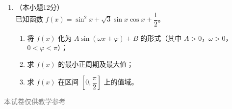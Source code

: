 \documentclass[12pt, a4paper]{ctexart}
\begin{document}
\begin{enumerate}[resume]
\vspace{7cm}

\item[22.]（本小题12分）\\
已知函数 $f(x)=\sin^2 x+\sqrt{3}\sin x\cos x+\dfrac{1}{2}$。
\begin{enumerate}[(1)]
  \item 将 $f(x)$ 化为 $A\sin(\omega x+\varphi)+B$ 的形式（其中 $A>0$，$\omega>0$，$0<\varphi<\pi$）；
  \item 求 $f(x)$ 的最小正周期及最大值；
  \item 求 $f(x)$ 在区间 $\left[0,\dfrac{\pi}{2}\right]$ 上的值域。
\end{enumerate}

\vspace{7cm}
\end{enumerate}

\vfill
\begin{center}
\small\textcolor{gray}{本试卷仅供教学参考}
\end{center}
\end{document}
